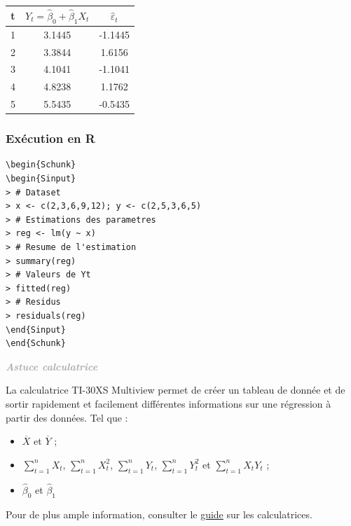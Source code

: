\documentclass[11pt,french]{report}
\newenvironment{moreInfo}[1]
	{\begin{mdframed}
	\textcolor{darkgray}{\huge \raisebox{-3.5pt}{\faInfo} 
	\hspace{0.5cm} \large\bfseries #1}\\[5pt]
	\normalsize
	\makebox[0.1\textwidth][l]{}	
	\begin{minipage}{10cm}}
	{	\end{minipage}
	\end{mdframed}}
\begin{document}
\begin{center}
\begin{tabular}{|c|c|c|}
\hline
t & $Y_t = \hat{\beta}_0 + \hat{\beta}_1X_t$ & $\hat{\varepsilon}_t$ \\
\hline
1 & 3.1445 & -1.1445 \\
2 & 3.3844 & 1.6156 \\
3 & 4.1041 & -1.1041 \\
4 & 4.8238 & 1.1762 \\
5 & 5.5435 & -0.5435 \\
\hline
\end{tabular}
\end{center}

\begin{center}
\end{center}

\bigskip
\subsubsection*{Exécution en R}
\begin{lstlisting}[linerange=\\begin\{Sinput\}-\\end\{Sinput\},includerangemarker=false, caption = Code source en R pour l'exemple]
\begin{Schunk}
\begin{Sinput}
> # Dataset
> x <- c(2,3,6,9,12); y <- c(2,5,3,6,5)
> # Estimations des parametres
> reg <- lm(y ~ x)
> # Resume de l'estimation
> summary(reg)
> # Valeurs de Yt
> fitted(reg)
> # Residus 
> residuals(reg)
\end{Sinput}
\end{Schunk}
\end{lstlisting}

\bigskip
\begin{moreInfo}{\emph{Astuce calculatrice}}
	La calculatrice TI-30XS Multiview permet de créer un tableau de donnée et de sortir rapidement et facilement différentes informations sur une régression à partir des données. Tel que :
	\begin{itemize}
	\item $\overline{X}$ et $\overline{Y}$ ;
	\item $\displaystyle\sum_{t=1}^n X_t$, $\displaystyle\sum_{t=1}^n X_t^2$, $\displaystyle\sum_{t=1}^n Y_t$, $\displaystyle\sum_{t=1}^n Y_t^2$ et $\displaystyle\sum_{t=1}^n X_tY_t$ ;
	\item $\hat{\beta}_0$ et $\hat{\beta}_1$
	\end{itemize}
	Pour de plus ample information, consulter le \href{https://github.com/alpa12/guide_calculatrice}{guide} sur les calculatrices.
\end{moreInfo}
\bigskip
\end{document}
